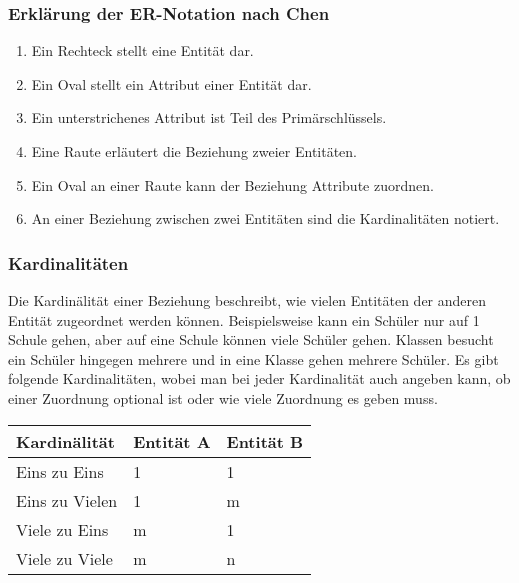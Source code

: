 \vspace*{0.3cm}

\subsubsection{Erklärung der ER-Notation nach Chen}

\vspace*{0.3cm}

\begin{enumerate}
    \item Ein Rechteck stellt eine Entität dar.
    \item Ein Oval stellt ein Attribut einer Entität dar.
    \item Ein unterstrichenes Attribut ist Teil des Primärschlüssels.
    \item Eine Raute erläutert die Beziehung zweier Entitäten.
    \item Ein Oval an einer Raute kann der Beziehung Attribute zuordnen.
    \item An einer Beziehung zwischen zwei Entitäten sind die Kardinalitäten notiert.
\end{enumerate}

\clearpage

\subsubsection{Kardinalitäten}

Die Kardinälität einer Beziehung beschreibt, wie vielen Entitäten der anderen
Entität zugeordnet werden können. Beispielsweise kann ein Schüler nur auf 1 Schule 
gehen, aber auf eine Schule können viele Schüler gehen. Klassen besucht ein Schüler
hingegen mehrere und in eine Klasse gehen mehrere Schüler. Es gibt folgende Kardinalitäten,
wobei man bei jeder Kardinalität auch angeben kann, ob einer Zuordnung optional ist
oder wie viele Zuordnung es geben muss.

\begin{table}[H]
    \begin{tabular}{|l|l|l|}
    \hline
        Kardinälität & Entität A & Entität B \\ \hline
        Eins zu Eins & 1 & 1 \\ \hline
        Eins zu Vielen & 1 & m \\ \hline
        Viele zu Eins & m & 1 \\ \hline
        Viele zu Viele & m & n \\ \hline
        \end{tabular}
\end{table}


